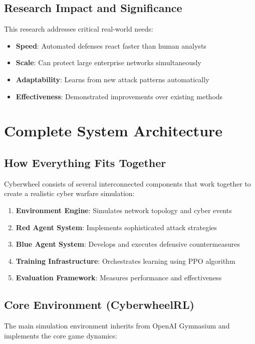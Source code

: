 \documentclass[12pt,a4paper]{article}
\begin{document}
\subsection{Research Impact and Significance}
This research addresses critical real-world needs:
\begin{itemize}
    \item \textbf{Speed}: Automated defenses react faster than human analysts
    \item \textbf{Scale}: Can protect large enterprise networks simultaneously  
    \item \textbf{Adaptability}: Learns from new attack patterns automatically
    \item \textbf{Effectiveness}: Demonstrated improvements over existing methods
\end{itemize}

\section{Complete System Architecture}

\subsection{How Everything Fits Together}

Cyberwheel consists of several interconnected components that work together to create a realistic cyber warfare simulation:

\begin{enumerate}
    \item \textbf{Environment Engine}: Simulates network topology and cyber events
    \item \textbf{Red Agent System}: Implements sophisticated attack strategies
    \item \textbf{Blue Agent System}: Develops and executes defensive countermeasures  
    \item \textbf{Training Infrastructure}: Orchestrates learning using PPO algorithm
    \item \textbf{Evaluation Framework}: Measures performance and effectiveness
\end{enumerate}

\subsection{Core Environment (CyberwheelRL)}

The main simulation environment inherits from OpenAI Gymnasium and implements the core game dynamics:
\end{document}
